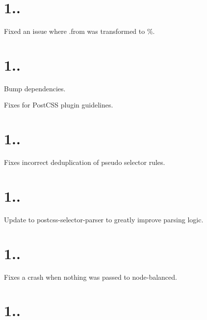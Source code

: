\section*{1..}


\begin{DoxyItemize}
\item Fixed an issue where {\ttfamily .from} was transformed to {\%}.
\end{DoxyItemize}

\section*{1..}


\begin{DoxyItemize}
\item Bump dependencies.
\item Fixes for Post\+C\+SS plugin guidelines.
\end{DoxyItemize}

\section*{1..}


\begin{DoxyItemize}
\item Fixes incorrect deduplication of pseudo selector rules.
\end{DoxyItemize}

\section*{1..}


\begin{DoxyItemize}
\item Update to postcss-\/selector-\/parser to greatly improve parsing logic.
\end{DoxyItemize}

\section*{1..}


\begin{DoxyItemize}
\item Fixes a crash when nothing was passed to {\ttfamily node-\/balanced}.
\end{DoxyItemize}

\section*{1..}


